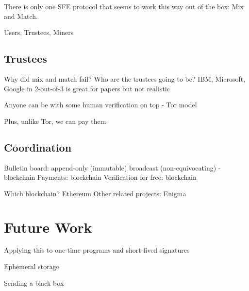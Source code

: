 There is only one SFE protocol that seems to work this way out of the box: Mix and Match.

Users, Trustees, Miners

\subsection{Trustees}

Why did mix and match fail? Who are the trustees going to be? IBM, Microsoft, Google in 2-out-of-3 is great for papers but not realistic 

Anyone can be with some human verification on top - Tor model 

Plus, unlike Tor, we can pay them

\subsection{Coordination}

Bulletin board: append-only (immutable) broadcast (non-equivocating) - blockchain
Payments: blockchain
Verification for free: blockchain

Which blockchain? Ethereum
Other related projects: Enigma

\section{Future Work}

Applying this to one-time programs and short-lived signatures

Ephemeral storage

Sending a black box

 

